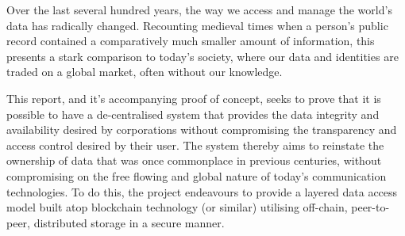 \abstract

\thispagestyle{plain}
\setcounter{page}{1}

Over the last several hundred years, the way we access and manage the world's data has radically changed. Recounting medieval times when a person's public record contained a comparatively much smaller amount of information, this presents a stark comparison to today's society, where our data and identities are traded on a global market, often without our knowledge.

This report, and it's accompanying proof of concept, seeks to prove that it is possible to have a de-centralised system that provides the data integrity and availability desired by corporations without compromising the transparency and access control desired by their user. The system thereby aims to reinstate the ownership of data that was once commonplace in previous centuries, without compromising on the free flowing and global nature of today's communication technologies. To do this, the project endeavours to provide a layered data access model built atop blockchain technology (or similar) utilising off-chain, peer-to-peer, distributed storage in a secure manner.
